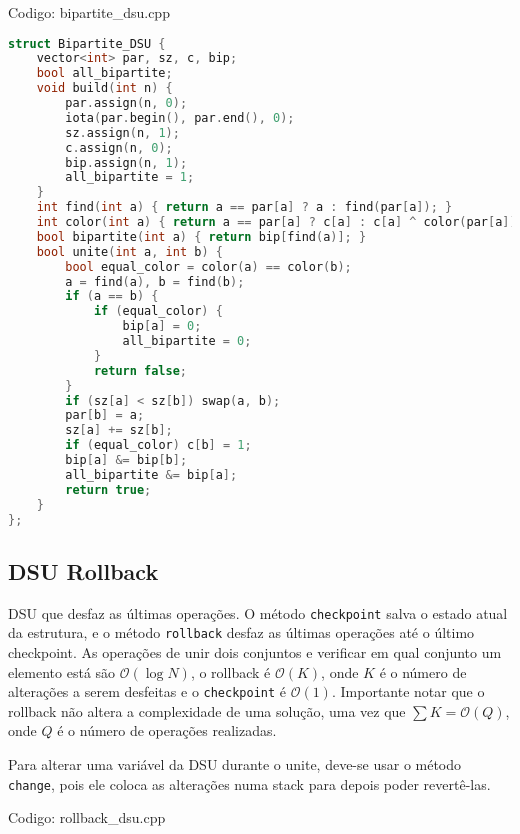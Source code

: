 \documentclass[10pt, a4paper, oneside]{book}
\begin{document}
\hfill

Codigo: bipartite\_dsu.cpp

\begin{lstlisting}[language=C++]
struct Bipartite_DSU {
    vector<int> par, sz, c, bip;
    bool all_bipartite;
    void build(int n) {
        par.assign(n, 0);
        iota(par.begin(), par.end(), 0);
        sz.assign(n, 1);
        c.assign(n, 0);
        bip.assign(n, 1);
        all_bipartite = 1;
    }
    int find(int a) { return a == par[a] ? a : find(par[a]); }
    int color(int a) { return a == par[a] ? c[a] : c[a] ^ color(par[a]); }
    bool bipartite(int a) { return bip[find(a)]; }
    bool unite(int a, int b) {
        bool equal_color = color(a) == color(b);
        a = find(a), b = find(b);
        if (a == b) {
            if (equal_color) {
                bip[a] = 0;
                all_bipartite = 0;
            }
            return false;
        }
        if (sz[a] < sz[b]) swap(a, b);
        par[b] = a;
        sz[a] += sz[b];
        if (equal_color) c[b] = 1;
        bip[a] &= bip[b];
        all_bipartite &= bip[a];
        return true;
    }
};
\end{lstlisting}
\hfill

\subsection{DSU Rollback}


DSU que desfaz as últimas operações. O método \texttt{checkpoint} salva o estado atual da estrutura, e o método \texttt{rollback} desfaz as últimas operações até o último checkpoint. As operações de unir dois conjuntos e verificar em qual conjunto um elemento está são $\mathcal{O}(\log N)$, o rollback é $\mathcal{O}(K)$, onde $K$ é o número de alterações a serem desfeitas e o \texttt{checkpoint} é $\mathcal{O}(1)$. Importante notar que o rollback não altera a complexidade de uma solução, uma vez que $\sum K = \mathcal{O}(Q)$, onde $Q$ é o número de operações realizadas.



Para alterar uma variável da DSU durante o unite, deve-se usar o método \texttt{change}, pois ele coloca as alterações numa stack para depois poder revertê-las.
\hfill

Codigo: rollback\_dsu.cpp
\end{document}
